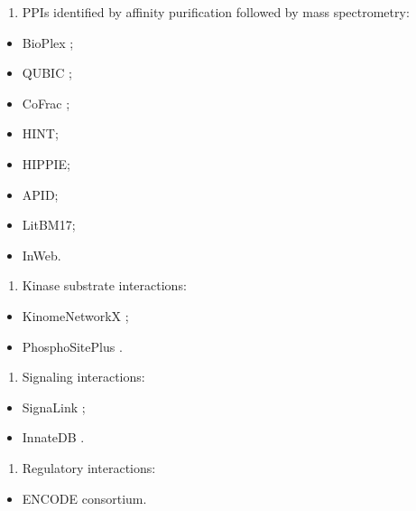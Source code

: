 \documentclass[
]{book}
\providecommand{\tightlist}{%
  \setlength{\itemsep}{0pt}\setlength{\parskip}{0pt}}
\begin{document}
\begin{enumerate}
\def\labelenumi{\arabic{enumi}.}
\setcounter{enumi}{3}
\tightlist
\item
  PPIs identified by affinity purification followed by mass spectrometry:
\end{enumerate}

\begin{itemize}
\tightlist
\item
  BioPlex \citep{Huttlin2017};
\item
  QUBIC \citep{Hein2015};
\item
  CoFrac \citep{wan2015};
\item
  HINT;
\item
  HIPPIE;
\item
  APID;
\item
  LitBM17;
\item
  InWeb.
\end{itemize}

\begin{enumerate}
\def\labelenumi{\arabic{enumi}.}
\setcounter{enumi}{4}
\tightlist
\item
  Kinase substrate interactions:
\end{enumerate}

\begin{itemize}
\tightlist
\item
  KinomeNetworkX \citep{cheng2014};
\item
  PhosphoSitePlus \citep{Hornbeck2015}.
\end{itemize}

\begin{enumerate}
\def\labelenumi{\arabic{enumi}.}
\setcounter{enumi}{5}
\tightlist
\item
  Signaling interactions:
\end{enumerate}

\begin{itemize}
\tightlist
\item
  SignaLink \citep{Fazekas2013};
\item
  InnateDB \citep{Breuer2013}.
\end{itemize}

\begin{enumerate}
\def\labelenumi{\arabic{enumi}.}
\setcounter{enumi}{6}
\tightlist
\item
  Regulatory interactions:
\end{enumerate}

\begin{itemize}
\tightlist
\item
  ENCODE consortium.
\end{itemize}
\end{document}
